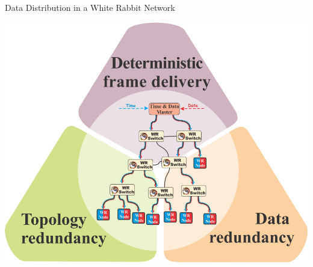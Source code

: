 \documentclass[compress,red]{beamer}
\begin{document}
\begin{frame}{Data Distribution in a White Rabbit Network }

    \vspace{-0.3cm}

    \begin{center}
    \includegraphics[height=0.8\textheight]{robustness/wrn_reliability.pdf}
    \end{center}
	  
    \vspace{-0.7cm}

\end{frame}
\end{document}
